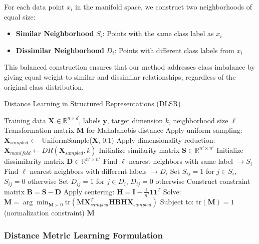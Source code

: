 \documentclass[review]{elsarticle}
\begin{document}
For each data point $x_i$ in the manifold space, we construct two neighborhoods of equal size:

\begin{itemize}
\item \textbf{Similar Neighborhood} $S_i$: Points with the same class label as $x_i$
\item \textbf{Dissimilar Neighborhood} $D_i$: Points with different class labels from $x_i$
\end{itemize}

This balanced construction ensures that our method addresses class imbalance by giving equal weight to similar and dissimilar relationships, regardless of the original class distribution.

\begin{algorithm}[H]
\caption{Distance Learning in Structured Representations (DLSR)}
\label{alg:dlsr}
\begin{algorithmic}[1]
\REQUIRE Training data $\mathbf{X} \in \mathbb{R}^{n \times d}$, labels $\mathbf{y}$, target dimension $k$, neighborhood size $\ell$
\ENSURE Transformation matrix $\mathbf{M}$ for Mahalanobis distance
\STATE Apply uniform sampling: $\mathbf{X}_{sampled} \leftarrow$ UniformSample($\mathbf{X}$, 0.1)
\STATE Apply dimensionality reduction: $\mathbf{X}_{manifold} \leftarrow DR(\mathbf{X}_{sampled}, k)$
\STATE Initialize similarity matrix $\mathbf{S} \in \mathbb{R}^{n' \times n'}$
\STATE Initialize dissimilarity matrix $\mathbf{D} \in \mathbb{R}^{n' \times n'}$
    \STATE Find $\ell$ nearest neighbors with same label $\rightarrow S_i$
    \STATE Find $\ell$ nearest neighbors with different labels $\rightarrow D_i$
    \STATE Set $S_{ij} = 1$ for $j \in S_i$, $S_{ij} = 0$ otherwise
    \STATE Set $D_{ij} = 1$ for $j \in D_i$, $D_{ij} = 0$ otherwise
\ENDFOR
\STATE Construct constraint matrix $\mathbf{B} = \mathbf{S} - \mathbf{D}$
\STATE Apply centering: $\mathbf{H} = \mathbf{I} - \frac{1}{n'}\mathbf{1}\mathbf{1}^T$
\STATE Solve: $\mathbf{M} = \arg\min_{\mathbf{M} \succ 0} \text{tr}(\mathbf{M} \mathbf{X}_{sampled}^T \mathbf{H} \mathbf{B} \mathbf{H} \mathbf{X}_{sampled})$
\STATE Subject to: $\text{tr}(\mathbf{M}) = 1$ (normalization constraint)
\RETURN $\mathbf{M}$
\end{algorithmic}
\end{algorithm}

\subsubsection{Distance Metric Learning Formulation}
\end{document}
